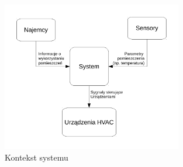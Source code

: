 \begin{figure}[bth]
    \centering
    \includegraphics[width=0.7\textwidth]{./diagrams/GeneralContextDiagram.pdf}
    \caption{Kontekst systemu}
    \label{fig:generalContextDiagram}    
\end{figure}
 